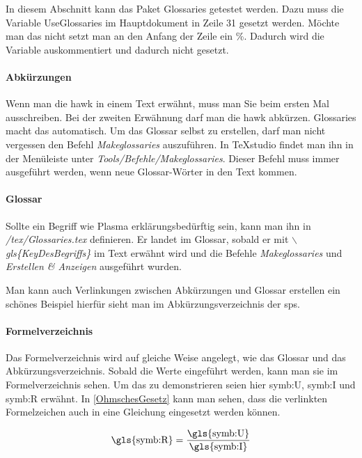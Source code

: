 	In diesem Abschnitt kann das Paket Glossaries getestet werden. Dazu muss die Variable UseGlossaries im Hauptdokument in Zeile 31 gesetzt werden. Möchte man das nicht setzt man an den Anfang der Zeile ein \%. Dadurch wird die Variable auskommentiert und dadurch nicht gesetzt.
	
	\paragraph{Abkürzungen}
	
	Wenn man die \gls{hawk} in einem Text erwähnt, muss man Sie beim ersten Mal ausschreiben. Bei der zweiten Erwähnung darf man die \gls{hawk} abkürzen. Glossaries macht das automatisch. Um das Glossar selbst zu erstellen, darf man nicht vergessen den Befehl \textit{Makeglossaries} auszuführen. In TeXstudio findet man ihn in der Menüleiste unter \textit{Tools/Befehle/Makeglossaries}. Dieser Befehl muss immer ausgeführt werden, wenn neue Glossar-Wörter in den Text kommen. 
	
	\paragraph{Glossar}
	
	Sollte ein Begriff wie \gls{Plasma} erklärungsbedürftig sein, kann man ihn in \textit{/tex/Glossaries.tex} definieren. Er landet im Glossar, sobald er mit \textit{$\backslash$gls\{KeyDesBegriffs\}} im Text erwähnt wird und die Befehle \textit{Makeglossaries} und \textit{Erstellen \& Anzeigen} ausgeführt wurden.
	
	Man kann auch Verlinkungen zwischen Abkürzungen und Glossar erstellen ein schönes Beispiel hierfür sieht man im Abkürzungsverzeichnis der \gls{sps}.
	
	
	\paragraph{Formelverzeichnis}
	
	Das Formelverzeichnis wird auf gleiche Weise angelegt, wie das Glossar und das Abkürzungsverzeichnis. Sobald die Werte eingeführt werden, kann man sie im Formelverzeichnis sehen. Um das zu demonstrieren seien hier \gls{symb:U}, \gls{symb:I} und \gls{symb:R} erwähnt. In \autoref{OhmschesGesetz} kann man sehen, dass die verlinkten Formelzeichen auch in eine Gleichung eingesetzt werden können.
	
	\begin{align}
		\text{\gls{symb:R}}=\frac{\text{\gls{symb:U}}}{\text{\gls{symb:I}}} \label{OhmschesGesetz}
		\end{align}
\fi	
	
	

